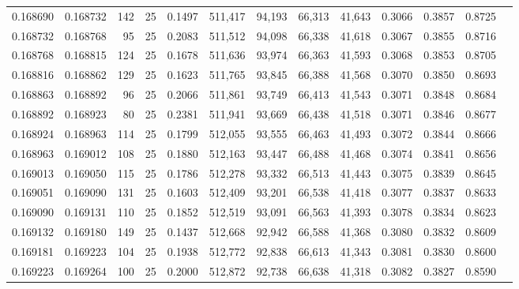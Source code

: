 \begin{tabular}{rrrrrrrrrrrrr}
0.168690 & 0.168732 &   142 &  25 &                                     0.1497 & 511,417 &  94,193 &  66,313 &  41,643 & 0.3066 & 0.3857 & 0.8725 \\
0.168732 & 0.168768 &    95 &  25 &                                     0.2083 & 511,512 &  94,098 &  66,338 &  41,618 & 0.3067 & 0.3855 & 0.8716 \\
0.168768 & 0.168815 &   124 &  25 &                                     0.1678 & 511,636 &  93,974 &  66,363 &  41,593 & 0.3068 & 0.3853 & 0.8705 \\
0.168816 & 0.168862 &   129 &  25 &                                     0.1623 & 511,765 &  93,845 &  66,388 &  41,568 & 0.3070 & 0.3850 & 0.8693 \\
0.168863 & 0.168892 &    96 &  25 &                                     0.2066 & 511,861 &  93,749 &  66,413 &  41,543 & 0.3071 & 0.3848 & 0.8684 \\
0.168892 & 0.168923 &    80 &  25 &                                     0.2381 & 511,941 &  93,669 &  66,438 &  41,518 & 0.3071 & 0.3846 & 0.8677 \\
0.168924 & 0.168963 &   114 &  25 &                                     0.1799 & 512,055 &  93,555 &  66,463 &  41,493 & 0.3072 & 0.3844 & 0.8666 \\
0.168963 & 0.169012 &   108 &  25 &                                     0.1880 & 512,163 &  93,447 &  66,488 &  41,468 & 0.3074 & 0.3841 & 0.8656 \\
0.169013 & 0.169050 &   115 &  25 &                                     0.1786 & 512,278 &  93,332 &  66,513 &  41,443 & 0.3075 & 0.3839 & 0.8645 \\
0.169051 & 0.169090 &   131 &  25 &                                     0.1603 & 512,409 &  93,201 &  66,538 &  41,418 & 0.3077 & 0.3837 & 0.8633 \\
0.169090 & 0.169131 &   110 &  25 &                                     0.1852 & 512,519 &  93,091 &  66,563 &  41,393 & 0.3078 & 0.3834 & 0.8623 \\
0.169132 & 0.169180 &   149 &  25 &                                     0.1437 & 512,668 &  92,942 &  66,588 &  41,368 & 0.3080 & 0.3832 & 0.8609 \\
0.169181 & 0.169223 &   104 &  25 &                                     0.1938 & 512,772 &  92,838 &  66,613 &  41,343 & 0.3081 & 0.3830 & 0.8600 \\
0.169223 & 0.169264 &   100 &  25 &                                     0.2000 & 512,872 &  92,738 &  66,638 &  41,318 & 0.3082 & 0.3827 & 0.8590 \\

\end{tabular}
